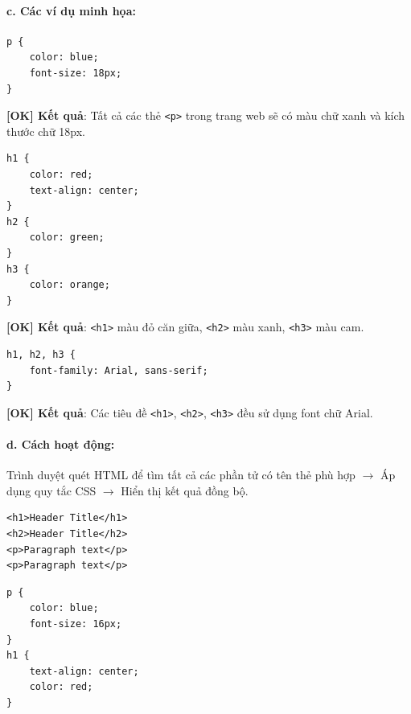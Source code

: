 \documentclass[11pt,oneside]{book}
\newcommand{\codeinline}[1]{\textcolor{accentOrange}{\texttt{#1}}}
\begin{document}
\paragraph{c. Các ví dụ minh họa:}
\begin{codeWindow}
\begin{lstlisting}[language=CSS3]
p {
    color: blue;
    font-size: 18px;
}
\end{lstlisting}
\end{codeWindow}
\textcolor{tipBorder}{\textbf{[OK] Kết quả}}: Tất cả các thẻ \codeinline{<p>} trong trang web sẽ có màu chữ xanh và kích thước chữ 18px.

\begin{codeWindow}
\begin{lstlisting}[language=CSS3]
h1 {
    color: red;
    text-align: center;
}
h2 {
    color: green;
}
h3 {
    color: orange;
}
\end{lstlisting}
\end{codeWindow}
\textcolor{tipBorder}{\textbf{[OK] Kết quả}}: \codeinline{<h1>} màu đỏ căn giữa, \codeinline{<h2>} màu xanh, \codeinline{<h3>} màu cam.

\begin{codeWindow}
\begin{lstlisting}[language=CSS3]
h1, h2, h3 {
    font-family: Arial, sans-serif;
}
\end{lstlisting}
\end{codeWindow}
\textcolor{tipBorder}{\textbf{[OK] Kết quả}}: Các tiêu đề \codeinline{<h1>}, \codeinline{<h2>}, \codeinline{<h3>} đều sử dụng font chữ Arial.

\paragraph{d. Cách hoạt động:}
Trình duyệt quét HTML để tìm tất cả các phần tử có tên thẻ phù hợp $\rightarrow$ Áp dụng quy tắc CSS $\rightarrow$ Hiển thị kết quả đồng bộ.

\begin{codeWindow}
\begin{lstlisting}[language=HTML5]
<h1>Header Title</h1>
<h2>Header Title</h2>
<p>Paragraph text</p>
<p>Paragraph text</p>
\end{lstlisting}

\begin{lstlisting}[language=CSS3]
p {
    color: blue;
    font-size: 16px;
}
h1 {
    text-align: center;
    color: red;
}
\end{lstlisting}
\end{codeWindow}
\end{document}
